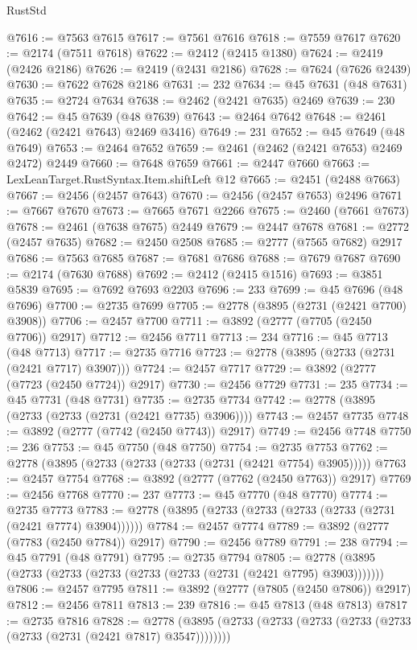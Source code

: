 \begin{lexlean}{RustStd}
\begin{coremodule}
@7616 := @7563 @7615
@7617 := @7561 @7616
@7618 := @7559 @7617
@7620 := @2174 (@7511 @7618)
@7622 := @2412 (@2415 @1380)
@7624 := @2419 (@2426 @2186)
@7626 := @2419 (@2431 @2186)
@7628 := @7624 (@7626 @2439)
@7630 := @7622 @7628 @2186
@7631 := 232
@7634 := @45 @7631 (@48 @7631)
@7635 := @2724 @7634
@7638 := @2462 (@2421 @7635) @2469
@7639 := 230
@7642 := @45 @7639 (@48 @7639)
@7643 := @2464 @7642
@7648 := @2461 (@2462 (@2421 @7643) @2469 @3416)
@7649 := 231
@7652 := @45 @7649 (@48 @7649)
@7653 := @2464 @7652
@7659 := @2461 (@2462 (@2421 @7653) @2469 @2472) @2449
@7660 := @7648 @7659
@7661 := @2447 @7660
@7663 := LexLeanTarget.RustSyntax.Item.shiftLeft @12
@7665 := @2451 (@2488 @7663)
@7667 := @2456 (@2457 @7643)
@7670 := @2456 (@2457 @7653) @2496
@7671 := @7667 @7670
@7673 := @7665 @7671 @2266
@7675 := @2460 (@7661 @7673)
@7678 := @2461 (@7638 @7675) @2449
@7679 := @2447 @7678
@7681 := @2772 (@2457 @7635)
@7682 := @2450 @2508
@7685 := @2777 (@7565 @7682) @2917
@7686 := @7563 @7685
@7687 := @7681 @7686
@7688 := @7679 @7687
@7690 := @2174 (@7630 @7688)
@7692 := @2412 (@2415 @1516)
@7693 := @3851 @5839
@7695 := @7692 @7693 @2203
@7696 := 233
@7699 := @45 @7696 (@48 @7696)
@7700 := @2735 @7699
@7705 := @2778 (@3895 (@2731 (@2421 @7700) @3908))
@7706 := @2457 @7700
@7711 := @3892 (@2777 (@7705 (@2450 @7706)) @2917)
@7712 := @2456 @7711
@7713 := 234
@7716 := @45 @7713 (@48 @7713)
@7717 := @2735 @7716
@7723 := @2778 (@3895 (@2733 (@2731 (@2421 @7717) @3907)))
@7724 := @2457 @7717
@7729 := @3892 (@2777 (@7723 (@2450 @7724)) @2917)
@7730 := @2456 @7729
@7731 := 235
@7734 := @45 @7731 (@48 @7731)
@7735 := @2735 @7734
@7742 := @2778 (@3895 (@2733 (@2733 (@2731 (@2421 @7735) @3906))))
@7743 := @2457 @7735
@7748 := @3892 (@2777 (@7742 (@2450 @7743)) @2917)
@7749 := @2456 @7748
@7750 := 236
@7753 := @45 @7750 (@48 @7750)
@7754 := @2735 @7753
@7762 := @2778 (@3895 (@2733 (@2733 (@2733 (@2731 (@2421 @7754) @3905)))))
@7763 := @2457 @7754
@7768 := @3892 (@2777 (@7762 (@2450 @7763)) @2917)
@7769 := @2456 @7768
@7770 := 237
@7773 := @45 @7770 (@48 @7770)
@7774 := @2735 @7773
@7783 := @2778 (@3895 (@2733 (@2733 (@2733 (@2733 (@2731 (@2421 @7774) @3904))))))
@7784 := @2457 @7774
@7789 := @3892 (@2777 (@7783 (@2450 @7784)) @2917)
@7790 := @2456 @7789
@7791 := 238
@7794 := @45 @7791 (@48 @7791)
@7795 := @2735 @7794
@7805 := @2778 (@3895 (@2733 (@2733 (@2733 (@2733 (@2733 (@2731 (@2421 @7795) @3903)))))))
@7806 := @2457 @7795
@7811 := @3892 (@2777 (@7805 (@2450 @7806)) @2917)
@7812 := @2456 @7811
@7813 := 239
@7816 := @45 @7813 (@48 @7813)
@7817 := @2735 @7816
@7828 := @2778 (@3895 (@2733 (@2733 (@2733 (@2733 (@2733 (@2733 (@2731 (@2421 @7817) @3547))))))))

\end{coremodule}
\end{lexlean}
